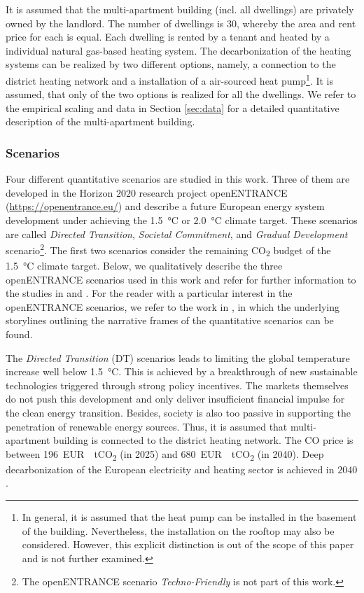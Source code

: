 It is assumed that the multi-apartment building (incl. all dwellings) are privately owned by the landlord. The number of dwellings is $30$, whereby the area and rent price for each is equal. Each dwelling is rented by a tenant and heated by a individual natural gas-based heating system. The decarbonization of the heating systems can be realized by two different options, namely, a connection to the district heating network and a installation of a air-sourced heat pump\footnote{In general, it is assumed that the heat pump can be installed in the basement of the building. Nevertheless, the installation on the rooftop may also be considered. However, this explicit distinction is out of the scope of this paper and is not further examined.}. It is assumed, that only of the two options is realized for all the dwellings. We refer to the empirical scaling and data in Section \ref{sec:data} for a detailed quantitative description of the multi-apartment building. 

\subsubsection{Scenarios}
Four different quantitative scenarios are studied in this work. Three of them are developed in the Horizon $2020$ research project openENTRANCE (\url{https://openentrance.eu/}) and describe a future European energy system development under achieving the \SI{1.5}{\degreeCelsius} or \SI{2.0}{\degreeCelsius} climate target. These scenarios are called \textit{Directed Transition}, \textit{Societal Commitment}, and \textit{Gradual Development} scenario\footnote{The openENTRANCE scenario \textit{Techno-Friendly} is not part of this work.}. The first two scenarios consider the remaining CO\textsubscript{2} budget of the \SI{1.5}{\degreeCelsius} climate target. Below, we qualitatively describe the three openENTRANCE scenarios used in this work and refer for further information to the studies in \cite{auer2020development} and \cite{auer2020quantitative}. For the reader with a particular interest in the openENTRANCE scenarios, we refer to the work in \cite{auer2019quantitative}, in which the underlying storylines outlining the narrative frames
of the quantitative scenarios can be found.\vspace{0.5cm}

The \textit{Directed Transition} (DT) scenarios leads to limiting the global temperature increase well below \SI{1.5}{\degreeCelsius}. This is achieved by a breakthrough of new sustainable technologies triggered through strong policy incentives. The markets themselves do not push this development and only deliver insufficient financial impulse for the clean energy transition. Besides, society is also too passive in supporting the penetration of renewable energy sources. Thus, it is assumed that multi-apartment building is connected to the district heating network. The CO price is between \SI{196}{EUR \per tCO_{2}} (in 2025) and \SI{680}{EUR \per tCO_{2}} (in 2040). Deep decarbonization of the European electricity and heating sector is achieved in $2040$.\vspace{0.5cm}

